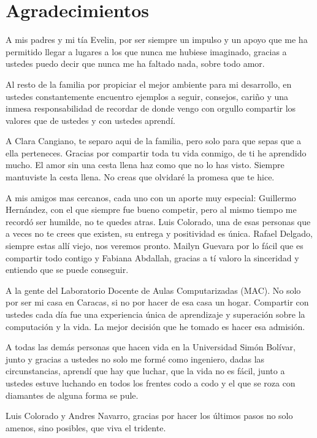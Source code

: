 \chapter*{Agradecimientos}

A mis padres y mi tía Evelin, por ser siempre un impulso y un apoyo que me ha permitido llegar a lugares a los que nunca me hubiese imaginado, gracias a ustedes puedo decir que nunca me ha faltado nada, sobre todo amor.

Al resto de la familia por propiciar el mejor ambiente para mi desarrollo, en ustedes constantemente encuentro ejemplos a seguir, consejos, cariño y una inmesa responsabilidad de recordar de donde vengo con orgullo compartir los valores que de ustedes y con ustedes aprendí. 

A Clara Cangiano, te separo aqui de la familia, pero solo para que sepas que a ella perteneces. Gracias por compartir toda tu vida conmigo, de ti he aprendido mucho. El amor sin una cesta llena haz como que no lo has visto. Siempre mantuviste la cesta llena. No creas que olvidaré la promesa que te hice.

A mis amigos mas cercanos, cada uno con un aporte muy especial: Guillermo Hernández, con el que siempre fue bueno competir, pero al mismo tiempo me recordó ser humilde, no te quedes atras. Luis Colorado, una de esas personas que a veces no te crees que existen, su entrega y positividad es única. Rafael Delgado, siempre estas allí viejo, nos veremos pronto. Mailyn Guevara por lo fácil que es compartir todo contigo y Fabiana Abdallah, gracias a tí valoro la sinceridad y entiendo que se puede conseguir.

A la gente del Laboratorio Docente de Aulas Computarizadas (MAC). No solo por ser mi casa en Caracas, si no por hacer de esa casa un hogar. Compartir con ustedes cada día fue una experiencia única de aprendizaje y superación sobre la computación y la vida. La mejor decisión que he tomado es hacer esa admisión.

A todas las demás personas que hacen vida en la Universidad Simón Bolívar, junto y gracias a ustedes no solo me formé como ingeniero, dadas las circunstancias, aprendí que hay que luchar, que la vida no es fácil, junto a ustedes estuve luchando en todos los frentes codo a codo y el que se roza con diamantes de alguna forma se pule.

Luis Colorado y Andres Navarro, gracias por hacer los últimos pasos no solo amenos, sino posibles, que viva el tridente.